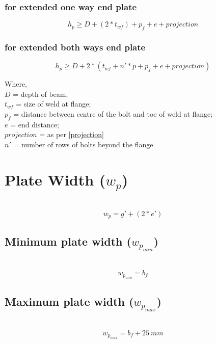 \documentclass[11.5pt,a4paper,oneside]{report}
\begin{document}
\begin{Form}
	\subsubsection{for extended one way end plate}
	\begin{equation}
	h_p \ge D + (2 * t_{wf}) + p_f + e + projection
	\end{equation}
	
	\subsubsection{for extended both ways end plate}
	\begin{equation}
	h_p \ge D + 2 * (t_{wf} + n'*p + p_f + e + projection)
	\end{equation}
				
		Where, \\
	\indent $D$ = depth of beam; \\
	\indent $t_{wf}$ = size of weld at flange; \\
	\indent $p_f$ =  distance between centre of the bolt and toe of weld at flange;\\
	\indent $e$ = end distance; \\
	\indent $projection$ = as per \ref{projection}\\
	\indent $n'$ = number of rows of bolts beyond the flange

\section{Plate Width (\boldmath $w_p$)}
\qquad {} \\
	\begin{equation}
		w_p = g' + (2 * e')
	\end{equation}

\subsection{Minimum plate width (\boldmath $w_{p_{min}}$)} 
\qquad {} \\
	\begin{equation}
		w_{p_{min}} = b_f
	\end{equation}

\subsection{Maximum plate width (\boldmath $w_{p_{max}}$)}
\qquad {} \\
	\begin{equation}
		w_{p_{max}} = b_f + 25~mm
	\end{equation}
			



\end{Form}
\end{document}
